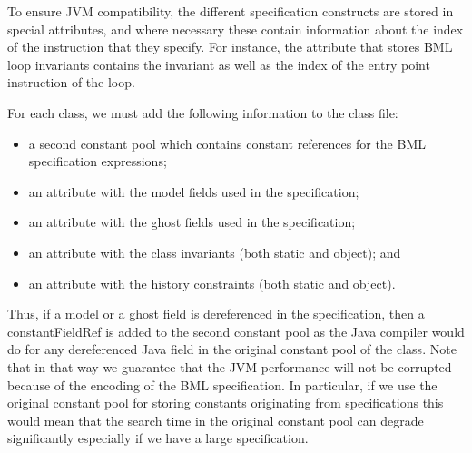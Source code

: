 To ensure JVM compatibility, the different specification constructs
are stored in special attributes, and where necessary these contain
information about the index of the instruction that they specify. For
instance, the attribute that stores BML loop invariants contains the
invariant as well as the index of the entry point instruction of the
loop.

For each class, we must add the following information to the class file:
\begin{itemize}
\item a second constant pool which contains constant references
      for the BML specification expressions;
\item an attribute with the model fields used in the specification;
\item an attribute with the ghost fields used in the specification;
\item an attribute with the class invariants (both static and object); and
\item an attribute with the history constraints (both static and object).
\end{itemize}



Thus, if a model or a ghost field
is dereferenced in the specification, then a constantFieldRef is added
to the second constant pool as the Java compiler would do for any
dereferenced Java field in the original constant pool of the class. 
Note that in that way we guarantee that the JVM performance 
will not be corrupted because of the encoding of the BML specification.
In particular, if we use the original constant pool for storing
constants originating from specifications this would mean that 
the search time in the original constant pool can degrade
significantly especially if we have a large specification. 


